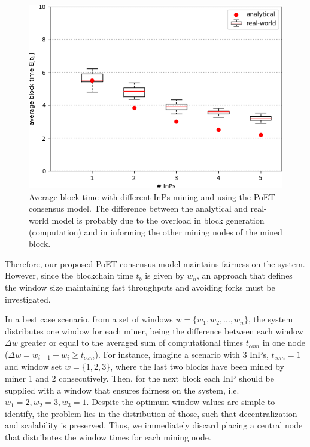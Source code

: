 \begin{figure}[bth]
	\centering
	\includegraphics[scale=0.7]{gfx/ev_block_time.png}    
  	\caption{Average block time with different InPs mining and using the PoET consensus model. The difference between the analytical and real-world model is probably due to the overload in block generation (computation) and in informing the other mining nodes of the mined block.}
  	\label{fig:block_time}
\end{figure}
  
  
Therefore, our proposed PoET consensus model maintains fairness on the system. However, since the blockchain time $t_b$ is given by $w_n$, an approach that defines the window size maintaining fast throughputs and avoiding forks must be investigated. 

In a best case scenario, from a set of windows $w = \{w_1,w_2,...,w_n\}$, the system distributes one window for each miner, being the difference between each window $\Delta w$ greater or equal to the averaged sum of computational times $t_{com}$ in one node ($\Delta w = w_{i+1} - w_i \geq t_{com} $). For instance, imagine a scenario with 3 InPs, $t_{com} = 1$ and window set $w = \{1,2,3\}$, where the last two blocks have been mined by miner 1 and 2 consecutively. Then, for the next block each InP should be supplied with a window that ensures fairness on the system, i.e. $w_1 = 2, w_2 = 3, w_3 = 1$. Despite the optimum window values are simple to identify, the problem lies in the distribution of those, such that decentralization and scalability is preserved. Thus, we immediately discard placing a central node that distributes the window times for each mining node.


